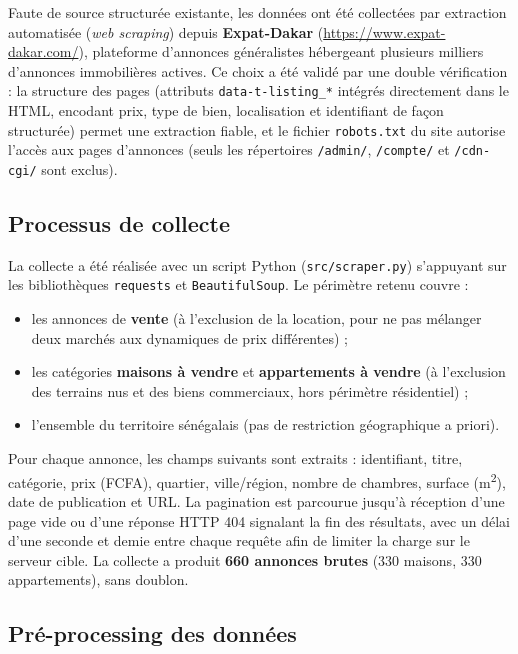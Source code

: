 Faute de source structurée existante, les données ont été collectées par extraction
automatisée (\emph{web scraping}) depuis \textbf{Expat-Dakar}
(\url{https://www.expat-dakar.com/}), plateforme d'annonces généralistes hébergeant plusieurs
milliers d'annonces immobilières actives. Ce choix a été validé par une double vérification :
la structure des pages (attributs \texttt{data-t-listing\_*} intégrés directement dans le HTML,
encodant prix, type de bien, localisation et identifiant de façon structurée) permet une
extraction fiable, et le fichier \texttt{robots.txt} du site autorise l'accès aux pages
d'annonces (seuls les répertoires \texttt{/admin/}, \texttt{/compte/} et \texttt{/cdn-cgi/} sont
exclus).

\subsection{Processus de collecte}

La collecte a été réalisée avec un script Python (\texttt{src/scraper.py}) s'appuyant sur les
bibliothèques \texttt{requests} et \texttt{BeautifulSoup}. Le périmètre retenu couvre :
\begin{itemize}
  \item les annonces de \textbf{vente} (à l'exclusion de la location, pour ne pas mélanger deux
  marchés aux dynamiques de prix différentes) ;
  \item les catégories \textbf{maisons à vendre} et \textbf{appartements à vendre} (à
  l'exclusion des terrains nus et des biens commerciaux, hors périmètre résidentiel) ;
  \item l'ensemble du territoire sénégalais (pas de restriction géographique a priori).
\end{itemize}

Pour chaque annonce, les champs suivants sont extraits : identifiant, titre, catégorie, prix
(FCFA), quartier, ville/région, nombre de chambres, surface (m\textsuperscript{2}), date de
publication et URL. La pagination est parcourue jusqu'à réception d'une page vide ou d'une
réponse HTTP 404 signalant la fin des résultats, avec un délai d'une seconde et demie entre
chaque requête afin de limiter la charge sur le serveur cible. La collecte a produit
\textbf{660 annonces brutes} (330 maisons, 330 appartements), sans doublon.

\subsection{Pré-processing des données}

